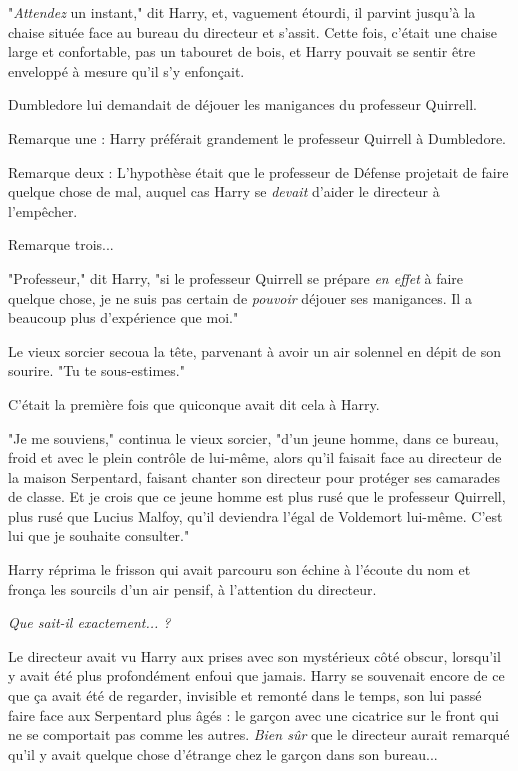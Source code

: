 "\emph{Attendez}  un instant," dit Harry, et, vaguement étourdi, il parvint jusqu'à la chaise située face au bureau du directeur et s'assit. Cette fois, c'était une chaise large et confortable, pas un tabouret de bois, et Harry pouvait se sentir être enveloppé à mesure qu'il s'y enfonçait.

Dumbledore lui demandait de déjouer les manigances du professeur Quirrell.

Remarque une : Harry préférait grandement le professeur Quirrell à Dumbledore.

Remarque deux : L'hypothèse était que le professeur de Défense projetait de faire quelque chose de mal, auquel cas Harry se \emph{devait}  d'aider le directeur à l'empêcher.

Remarque trois...

"Professeur," dit Harry, "si le professeur Quirrell se prépare \emph{en effet}  à faire quelque chose, je ne suis pas certain de \emph{pouvoir}  déjouer ses manigances. Il a beaucoup plus d'expérience que moi."

Le vieux sorcier secoua la tête, parvenant à avoir un air solennel en dépit de son sourire. "Tu te sous-estimes."

C'était la première fois que quiconque avait dit cela à Harry.

"Je me souviens," continua le vieux sorcier, "d'un jeune homme, dans ce bureau, froid et avec le plein contrôle de lui-même, alors qu'il faisait face au directeur de la maison Serpentard, faisant chanter son directeur pour protéger ses camarades de classe. Et je crois que ce jeune homme est plus rusé que le professeur Quirrell, plus rusé que Lucius Malfoy, qu'il deviendra l'égal de Voldemort lui-même. C'est lui que je souhaite consulter."

Harry réprima le frisson qui avait parcouru son échine à l'écoute du nom et fronça les sourcils d'un air pensif, à l'attention du directeur.

\emph{Que sait-il exactement... ?} 

Le directeur avait vu Harry aux prises avec son mystérieux côté obscur, lorsqu'il y avait été plus profondément enfoui que jamais. Harry se souvenait encore de ce que ça avait été de regarder, invisible et remonté dans le temps, son lui passé faire face aux Serpentard plus âgés : le garçon avec une cicatrice sur le front qui ne se comportait pas comme les autres. \emph{Bien sûr}  que le directeur aurait remarqué qu'il y avait quelque chose d'étrange chez le garçon dans son bureau...

